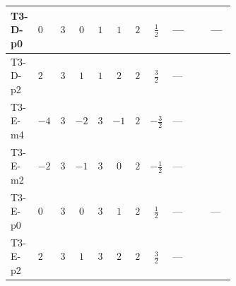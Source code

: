 \documentclass[8pt]{article}
\begin{document}
\begin{landscape}
\begin{longtable}{@{}llcccccc >{\raggedright\arraybackslash}p{0.21\linewidth} >{\raggedright\arraybackslash}p{0.21\linewidth} >{\raggedright\arraybackslash}p{0.21\linewidth}@{}}
\midrule
T3-D-p0 & $0$ & $3$ & $0$ & $1$ & $1$ & $2$ & $\frac{1}{2}$ & --- & \scriptsize\adjustbox{max width=\linewidth}{$\begin{gathered} -4 \operatorname{Tr}\!\left({M_F}\,\left({M_F}\right)^{\dagger}\,\left({y_1}\right)^{T}\,\left({y_1}\right)^{*}\right)\end{gathered}$} & --- \\
\midrule
T3-D-p2 & $2$ & $3$ & $1$ & $1$ & $2$ & $2$ & $\frac{3}{2}$ & --- & \scriptsize\adjustbox{max width=\linewidth}{$\begin{gathered} -4 \operatorname{Tr}\!\left({M_F}\,\left({M_F}\right)^{\dagger}\,\left({y_1}\right)^{T}\,\left({y_1}\right)^{*}\right)\end{gathered}$} & \scriptsize\adjustbox{max width=\linewidth}{$\begin{gathered} -6 {g_1}^2 {m_1^2}\end{gathered}$} \\
\midrule
T3-E-m4 & $-4$ & $3$ & $-2$ & $3$ & $-1$ & $2$ & $-\frac{3}{2}$ & --- & \scriptsize\adjustbox{max width=\linewidth}{$\begin{gathered} -4 \operatorname{Tr}\!\left({M_F}\,\left({M_F}\right)^{\dagger}\,\left({y_1}\right)^{T}\,\left({y_1}\right)^{*}\right)\end{gathered}$} & \scriptsize\adjustbox{max width=\linewidth}{$\begin{gathered} -24 {g_1}^2 {m_1^2}\end{gathered}$} \\
\midrule
T3-E-m2 & $-2$ & $3$ & $-1$ & $3$ & $0$ & $2$ & $-\frac{1}{2}$ & --- & \scriptsize\adjustbox{max width=\linewidth}{$\begin{gathered} -4 \operatorname{Tr}\!\left({M_F}\,\left({M_F}\right)^{\dagger}\,\left({y_1}\right)^{T}\,\left({y_1}\right)^{*}\right)\end{gathered}$} & \scriptsize\adjustbox{max width=\linewidth}{$\begin{gathered} -6 {g_1}^2 {m_1^2}\end{gathered}$} \\
\midrule
T3-E-p0 & $0$ & $3$ & $0$ & $3$ & $1$ & $2$ & $\frac{1}{2}$ & --- & \scriptsize\adjustbox{max width=\linewidth}{$\begin{gathered} -4 \operatorname{Tr}\!\left({M_F}\,\left({M_F}\right)^{\dagger}\,\left({y_1}\right)^{T}\,\left({y_1}\right)^{*}\right)\end{gathered}$} & --- \\
\midrule
T3-E-p2 & $2$ & $3$ & $1$ & $3$ & $2$ & $2$ & $\frac{3}{2}$ & --- & \scriptsize\adjustbox{max width=\linewidth}{$\begin{gathered} -4 \operatorname{Tr}\!\left({M_F}\,\left({M_F}\right)^{\dagger}\,\left({y_1}\right)^{T}\,\left({y_1}\right)^{*}\right)\end{gathered}$} & \scriptsize\adjustbox{max width=\linewidth}{$\begin{gathered} -6 {g_1}^2 {m_1^2}\end{gathered}$} \\

\end{longtable}
\end{landscape}
\end{document}
